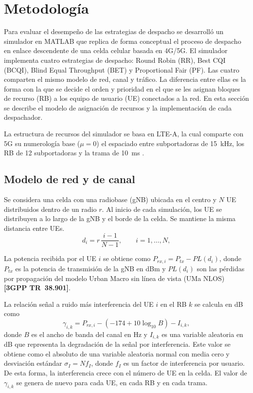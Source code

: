 
\section{Metodología}\label{sec:metodologia}

Para evaluar el desempeño de las estrategias de despacho se desarrolló un simulador
en MATLAB que replica de forma conceptual el proceso de
despacho en enlace descendente de una celda celular basada en 4G/5G.
El simulador implementa cuatro estrategias de despacho: Round Robin (RR), 
Best CQI (BCQI), Blind Equal Throughput (BET) y Proportional Fair (PF). 
Las cuatro comparten el mismo modelo de red, canal y tráfico. La diferencia
entre ellas es la forma con la que se decide el orden y prioridad en el que 
se les asignan bloques de recurso (RB) a los equipo de usuario (UE) conectados
a la red. En esta sección se describe el modelo de asignación de recursos
y la implementación de cada despachador.

La estructura de recursos del simulador se basa en LTE-A, la cual
comparte con 5G su numerología base ($\mu = 0$) el espaciado entre
subportadoras de 15~kHz, los RB de 12 subportadoras y la trama de 10~ms
\citep{lin2019}.

\subsection{Modelo de red y de canal}\label{subsec:modelo}

Se considera una celda con una radiobase (gNB) ubicada en el centro y $N$
UE distribuidos dentro de un radio $r$. Al inicio de cada simulación, los
UE se distribuyen a lo largo de la gNB y el borde de la celda. Se
mantiene la misma distancia entre UEs.
\begin{equation}
  d_i = r\,\frac{i-1}{N-1}, \qquad i = 1, \dots, N,
  \label{eq:distancias}
\end{equation}

La potencia recibida por el UE $i$ se obtiene como
$P_{rx,i} = P_{tx} - PL(d_i)$, donde $P_{tx}$ es la potencia de
transmisión de la gNB en dBm y $PL(d_i)$ son las pérdidas por
propagación del modelo Urban Macro sin línea de vista (UMa NLOS)
\textbf{[3GPP TR~38.901]}.

La relación señal a ruido más interferencia del UE $i$ en el RB $k$ se
calcula en dB como
\begin{equation}
  \gamma_{i,k} = P_{rx,i} - \left(-174 + 10\log_{10}B\right) - I_{i,k},
  \label{eq:sinr}
\end{equation}
donde $B$ es el ancho de banda del canal en Hz y $I_{i,k}$ es una variable
aleatoria en dB que representa la degradación de la señal por
interferencia. Este valor se obtiene como el absoluto de una
variable aleatoria normal con media cero y desviación estándar
$\sigma_I = N f_I$, donde $f_I$ es un factor de interferencia por usuario.
De esta forma, la interferencia crece con el número de UE en la celda. El
valor de $\gamma_{i,k}$ se genera de nuevo para cada UE, en cada RB y en
cada trama.


